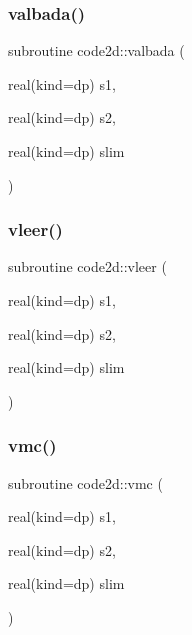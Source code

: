 \mbox{\label{main1DOr2_8f90_ac6b2b51b381114cb3bc7fa9abc69dee7}} 
\subsubsection{\texorpdfstring{valbada()}{valbada()}}
{\footnotesize\ttfamily subroutine code2d\+::valbada (\begin{DoxyParamCaption}\item[{real(kind=dp)}]{s1,  }\item[{real(kind=dp)}]{s2,  }\item[{real(kind=dp)}]{slim }\end{DoxyParamCaption})}

\mbox{\label{main1DOr2_8f90_af50a25d9d5f073c1347e643d589770ac}} 
\subsubsection{\texorpdfstring{vleer()}{vleer()}}
{\footnotesize\ttfamily subroutine code2d\+::vleer (\begin{DoxyParamCaption}\item[{real(kind=dp)}]{s1,  }\item[{real(kind=dp)}]{s2,  }\item[{real(kind=dp)}]{slim }\end{DoxyParamCaption})}

\mbox{\label{main1DOr2_8f90_a236c2f231e6eabfc3ddff4bc2f56bb99}} 
\subsubsection{\texorpdfstring{vmc()}{vmc()}}
{\footnotesize\ttfamily subroutine code2d\+::vmc (\begin{DoxyParamCaption}\item[{real(kind=dp)}]{s1,  }\item[{real(kind=dp)}]{s2,  }\item[{real(kind=dp)}]{slim }\end{DoxyParamCaption})}

